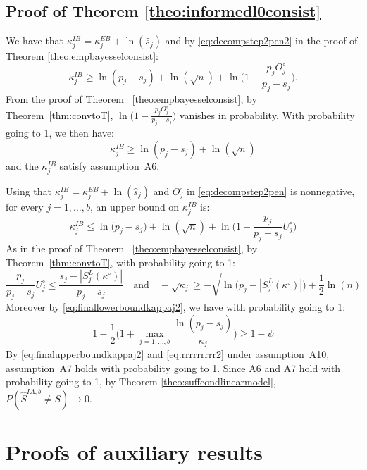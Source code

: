 \documentclass[aos]{imsart}
\theoremstyle{plain}
\begin{document}
\subsection{Proof of Theorem \ref{theo:informedl0consist}} We have that $\kappa_j^{IB}=\kappa_j^{EB}+\ln(\widehat s_j)$ and by \eqref{eq:decompstep2pen2} in the proof of Theorem \ref{theo:empbayesselconsist}:
\begin{equation*}
    \kappa_j^{IB}
    \geq  \ln(p_j-s_j)+\ln(\sqrt{n})+\ln\Big(1-\frac{p_j O^{\circ}_j}{p_j-s_j}\Big).
\end{equation*}
From the proof of Theorem ~\ref{theo:empbayesselconsist}, by Theorem~\ref{thm:convtoT}, $\ln\Big(1-\frac{p_j O^{\circ}_j}{p_j-s_j}\Big)$ vanishes in probability. With probability going to 1, we then have:
\begin{equation}\label{eq:finallowerboundkappaj2}\kappa^{IB}_j 
    \geq  \ln(p_j-s_j)+\ln(\sqrt{n})
\end{equation}
and the $\kappa^{IB}_j$ satisfy assumption~A6.

Using that $\kappa_j^{IB}=\kappa_j^{EB}+\ln(\widehat s_j)$ and $O_j^{\circ}$ in \eqref{eq:decompstep2pen} is nonnegative, for every $j=1,\ldots,b$, an upper bound on $\kappa^{IB}_j$ is:
\begin{equation*}
    \kappa^{IB}_j \leq \ln\big(p_j-s_j\big)+\ln(\sqrt{n})+\ln\bigg(1+\frac{p_j}{p_j-s_j}U^{\circ}_j\bigg)
\end{equation*}
As in the proof of Theorem ~\ref{theo:empbayesselconsist}, by Theorem~\ref{thm:convtoT}, with probability going to 1:
\begin{equation}\label{eq:finalupperboundkappaj2}
    \frac{p_j}{p_j-s_j}U^{\circ}_j \leq \frac{s_j-|S^{L}_j(\kappa^{\circ})|}{p_j-s_j}\quad\text{and}\quad -\sqrt{\kappa_j} \geq -\sqrt{\ln\big(p_j-|S^{L}_j(\kappa^{\circ})|\big)+\frac{1}{2}\ln(n)}
\end{equation}
Moreover by \eqref{eq:finallowerboundkappaj2}, we have with probability going to 1:
\begin{equation}\label{eq:rrrrrrrrr2}
    1-\frac12\Big(1+\max_{j=1, \ldots,b}\frac{\ln(p_j-s_j)}{\kappa_j}\Big) \geq 1-\psi
\end{equation}
By \eqref{eq:finalupperboundkappaj2} and \eqref{eq:rrrrrrrrr2}  under assumption~A10, assumption~A7 holds with probability going to 1. Since A6 and A7 hold with probability going to 1, by Theorem \ref{theo:suffcondlinearmodel}, $P(\hat{S}^{IA,b}\neq S) \to 0$.

\section{Proofs of auxiliary results}\label{sec:proofauxi}
\end{document}
